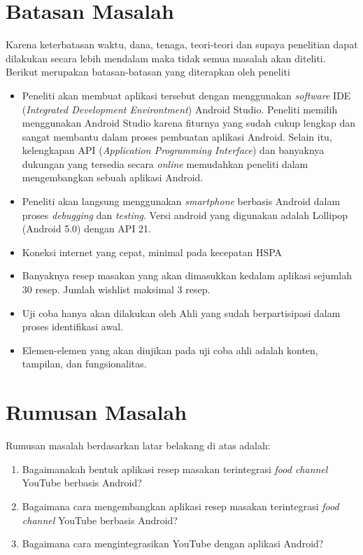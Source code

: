 \section{Batasan Masalah}
Karena keterbatasan waktu, dana, tenaga, teori-teori dan supaya penelitian dapat dilakukan secara lebih mendalam maka tidak semua masalah akan diteliti. Berikut merupakan batasan-batasan yang diterapkan oleh peneliti
\begin{itemize}
	\item Peneliti akan membuat aplikasi tersebut dengan menggunakan \emph{software}  IDE (\emph{Integrated Development Environtment}) Android Studio. Peneliti memilih menggunakan Android Studio karena fiturnya yang sudah cukup lengkap dan sangat membantu dalam proses pembuatan aplikasi Android. Selain itu, kelengkapan API (\emph{Application Programming Interface}) dan banyaknya dukungan yang tersedia secara \emph{online} memudahkan peneliti dalam mengembangkan sebuah aplikasi Android.
	\item  Peneliti akan langsung menggunakan \emph{smartphone} berbasis Android dalam proses \emph{debugging} dan \emph{testing}. Versi android yang digunakan adalah Lollipop (Android 5.0) dengan API 21.
	\item Koneksi internet yang cepat, minimal pada kecepatan HSPA
	\item Banyaknya resep masakan yang akan dimasukkan kedalam aplikasi sejumlah 30 resep. Jumlah wishlist maksimal 3 resep.
	\item Uji coba hanya akan dilakukan oleh Ahli yang sudah berpartisipasi dalam proses identifikasi awal.
	\item Elemen-elemen yang akan diujikan pada uji coba ahli adalah konten, tampilan, dan fungsionalitas.
\end{itemize}
\vspace{1cm}
\section{Rumusan Masalah}
Rumusan masalah berdasarkan latar belakang di atas adalah:
\begin{enumerate}
	\item Bagaimanakah bentuk aplikasi resep masakan terintegrasi \emph{food channel} YouTube berbasis Android?
	\item Bagaimana cara mengembangkan aplikasi resep masakan terintegrasi \emph{food channel} YouTube berbasis Android?
	\item Bagaimana cara mengintegrasikan YouTube dengan aplikasi Android?
\end{enumerate}


